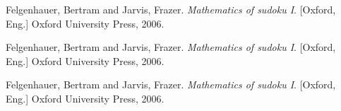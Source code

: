 \documentclass[11pt,a4paper]{report}
\begin{document}
\begin{thebibliography}{9}

\bibitem{}
	Felgenhauer, Bertram and Jarvis, Frazer.
	\emph{Mathematics of sudoku I}.
	[Oxford, Eng.] Oxford University Press,
	2006.

\bibitem{}
	Felgenhauer, Bertram and Jarvis, Frazer.
	\emph{Mathematics of sudoku I}.
	[Oxford, Eng.] Oxford University Press,
	2006.

\bibitem{}
	Felgenhauer, Bertram and Jarvis, Frazer.
	\emph{Mathematics of sudoku I}.
	[Oxford, Eng.] Oxford University Press,
	2006.
\end{thebibliography}
\end{document}
